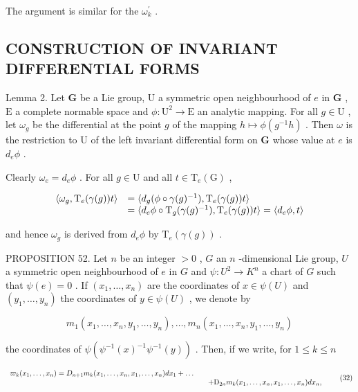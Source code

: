 The argument is similar for the \(\omega_{k}^{\prime}\) .

\subsection{CONSTRUCTION OF INVARIANT DIFFERENTIAL FORMS}

Lemma 2. Let \(\mathbf{G}\) be a Lie group, \(\mathrm{U}\) a symmetric open neighbourhood of \(e\) in \(\mathbf{G}\) , \(\mathrm{E}\) a complete normable space and \(\phi: \mathrm{U}^2 \to \mathrm{E}\) an analytic mapping. For all \(g \in \mathrm{U}\) , let \(\omega_g\) be the differential at the point \(g\) of the mapping \(h \mapsto \phi(g^{-1}h)\) . Then \(\omega\) is the restriction to \(\mathrm{U}\) of the left invariant differential form on \(\mathbf{G}\) whose value at \(e\) is \(d_e\phi\) .

Clearly \(\omega_{e} = d_{e}\phi\) . For all \(g \in \mathrm{U}\) and all \(t \in \mathrm{T}_{e}(\mathrm{G})\) ,

\[
\begin{array}{r l} \langle \omega_ {g}, \mathrm{T} _ {e} (\gamma (g)) t \rangle & = \langle d _ {g} (\phi \circ \gamma (g) ^ {- 1}), \mathrm{T} _ {e} (\gamma (g)) t \rangle \\ & = \langle d _ {e} \phi \circ \mathrm{T} _ {g} (\gamma (g) ^ {- 1}), \mathrm{T} _ {e} (\gamma (g)) t \rangle = \langle d _ {e} \phi , t \rangle \end{array}
\]

and hence \(\omega_{g}\) is derived from \(d_{e}\phi\) by \(\mathrm{T}_{e}(\gamma(g))\) .

PROPOSITION 52. Let \(n\) be an integer \(>0\) , \(G\) an \(n\) -dimensional Lie group, \(U\) a symmetric open neighbourhood of \(e\) in \(G\) and \(\psi: U^2 \to K^n\) a chart of \(G\) such that \(\psi(e) = 0\) . If \((x_1, \ldots, x_n)\) are the coordinates of \(x \in \psi(U)\) and \((y_1, \ldots, y_n)\) the coordinates of \(y \in \psi(U)\) , we denote by

\[
m _ {1} (x _ {1}, \dots , x _ {n}, y _ {1}, \dots , y _ {n}), \dots , m _ {n} (x _ {1}, \dots , x _ {n}, y _ {1}, \dots , y _ {n})
\]

the coordinates of \(\psi (\psi^{-1}(x)^{-1}\psi^{-1}(y))\) . Then, if we write, for \(1\leqslant k\leqslant n\)

\[
\begin{array}{r l} \varpi_ {k} (x _ {1}, \ldots , x _ {n}) = D _ {n + 1} m _ {k} (x _ {1}, \ldots , x _ {n}, x _ {1}, \ldots , x _ {n}) d x _ {1} + \dots \\ & \quad + \mathrm{D} _ {2 n} m _ {k} (x _ {1}, \ldots , x _ {n}, x _ {1}, \ldots , x _ {n}) d x _ {n}, \end{array}\tag{32}
\]

